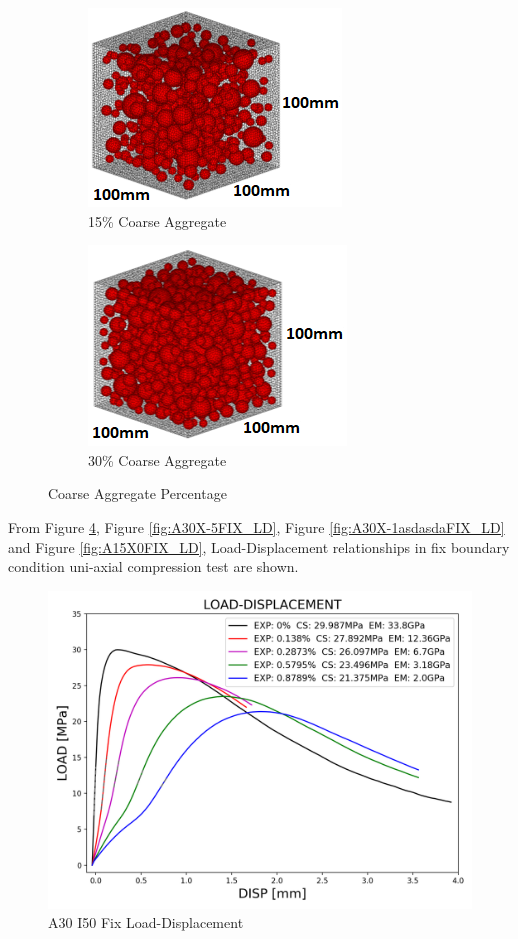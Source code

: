 \begin{figure}[!h]
\centering
\begin{subfigure}{.5\textwidth}
  \centering
  \includegraphics[width=.4\linewidth]{Files/Aggregate/A15.png}
  \caption{15\% Coarse Aggregate}
  \label{fig:A15_model}
\end{subfigure}%
\begin{subfigure}{.5\textwidth}
  \centering
  \includegraphics[width=.4\linewidth]{Files/Aggregate/A30.png}
  \caption{30\% Coarse Aggregate}
  \label{fig:A15_model}
\end{subfigure}
\caption{Coarse Aggregate Percentage}
\label{ahhhhh}
\end{figure}

From Figure \ref{fig:A30X0FIX_LD}, Figure \ref{fig:A30X-5FIX_LD}, Figure \ref{fig:A30X-1asdasdaFIX_LD} and Figure \ref{fig:A15X0FIX_LD}, Load-Displacement relationships in fix boundary condition uni-axial compression test are shown.


\begin{figure}[ht!]
\centering
\includegraphics[width=.8\linewidth]{Files/exp_3D/DEF/S13A30FIXX0-LOAD-DISPLACEMENT.png}
  \caption{A30 I50 Fix Load-Displacement}
  \label{fig:A30X0FIX_LD}
\end{figure}

